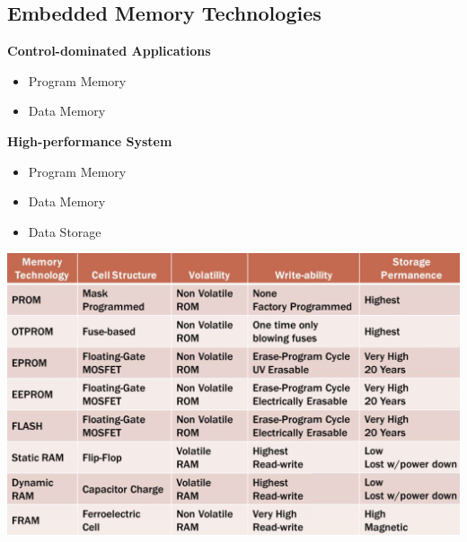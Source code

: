 \subsection{Embedded Memory Technologies }
\begin{minipage}{0.5\linewidth}
   \textbf{Control-dominated Applications}
       \begin{itemize}
       \item Program Memory
       \item Data Memory
   \end{itemize}
    \textbf{High-performance System}
\begin{itemize}
    \item Program Memory
    \item Data Memory
    \item Data Storage
\end{itemize}
\end{minipage}
\begin{minipage}{0.5\linewidth}
    \includegraphics[width=\linewidth]{images/MemoryTech}
\end{minipage}
\clearpage
\pagebreak

